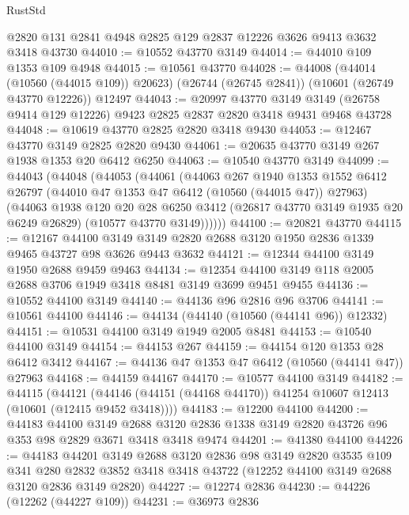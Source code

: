 \begin{lexlean}{RustStd}
\begin{coremodule}
    @2820
    @131
    @2841
    @4948
    @2825
    @129
    @2837
    @12226
    @3626
    @9413
    @3632
    @3418
    @43730
@44010 := @10552 @43770 @3149
@44014 := @44010 @109 @1353 @109 @4948
@44015 := @10561 @43770
@44028 := @44008
    (@44014 (@10560 (@44015 @109)) @20623)
    (@26744 (@26745 @2841))
    (@10601 (@26749 @43770 @12226))
    @12497
@44043 := @20997
    @43770
    @3149
    @3149
    (@26758 @9414 @129 @12226)
    @9423
    @2825
    @2837
    @2820
    @3418
    @9431
    @9468
    @43728
@44048 := @10619 @43770 @2825 @2820 @3418 @9430
@44053 := @12467 @43770 @3149 @2825 @2820 @9430
@44061 := @20635 @43770 @3149 @267 @1938 @1353 @20 @6412 @6250
@44063 := @10540 @43770 @3149
@44099 := @44043
    (@44048
      (@44053
        (@44061
          (@44063
            @267
            @1940
            @1353
            @1552
            @6412
            @26797
            (@44010 @47 @1353 @47 @6412 (@10560 (@44015 @47)) @27963)
            (@44063
              @1938
              @120
              @20
              @28
              @6250
              @3412
              (@26817 @43770 @3149 @1935 @20 @6249 @26829)
              (@10577 @43770 @3149))))))
@44100 := @20821 @43770
@44115 := @12167
    @44100
    @3149
    @3149
    @2820
    @2688
    @3120
    @1950
    @2836
    @1339
    @9465
    @43727
    @98
    @3626
    @9443
    @3632
@44121 := @12344 @44100 @3149 @1950 @2688 @9459 @9463
@44134 := @12354 @44100 @3149 @118 @2005 @2688 @3706 @1949 @3418 @8481 @3149 @3699 @9451 @9455
@44136 := @10552 @44100 @3149
@44140 := @44136 @96 @2816 @96 @3706
@44141 := @10561 @44100
@44146 := @44134 (@44140 (@10560 (@44141 @96)) @12332)
@44151 := @10531 @44100 @3149 @1949 @2005 @8481
@44153 := @10540 @44100 @3149
@44154 := @44153 @267
@44159 := @44154 @120 @1353 @28 @6412 @3412
@44167 := @44136 @47 @1353 @47 @6412 (@10560 (@44141 @47)) @27963
@44168 := @44159 @44167
@44170 := @10577 @44100 @3149
@44182 := @44115
    (@44121 (@44146 (@44151 (@44168 @44170)) @41254 @10607 @12413 (@10601 (@12415 @9452 @3418))))
@44183 := @12200 @44100
@44200 := @44183
    @44100
    @3149
    @2688
    @3120
    @2836
    @1338
    @3149
    @2820
    @43726
    @96
    @353
    @98
    @2829
    @3671
    @3418
    @3418
    @9474
@44201 := @41380 @44100
@44226 := @44183
    @44201
    @3149
    @2688
    @3120
    @2836
    @98
    @3149
    @2820
    @3535
    @109
    @341
    @280
    @2832
    @3852
    @3418
    @3418
    @43722
    (@12252 @44100 @3149 @2688 @3120 @2836 @3149 @2820)
@44227 := @12274 @2836
@44230 := @44226 (@12262 (@44227 @109))
@44231 := @36973 @2836

\end{coremodule}
\end{lexlean}
